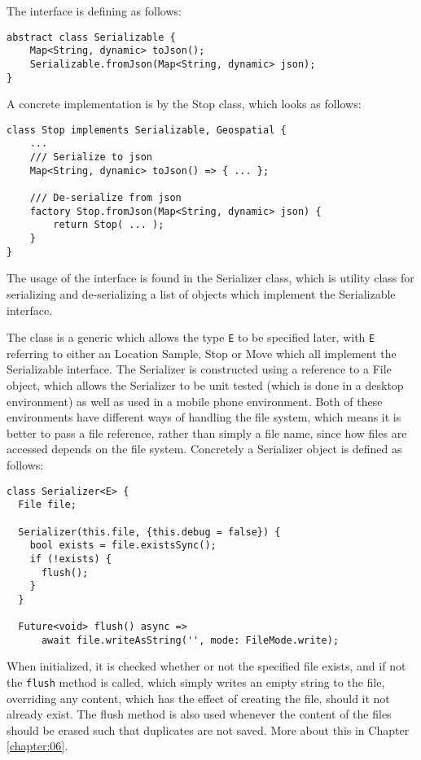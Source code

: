The interface is defining as follows:
\begin{verbatim}
abstract class Serializable {
    Map<String, dynamic> toJson();
    Serializable.fromJson(Map<String, dynamic> json);
}
\end{verbatim}

A concrete implementation is by the Stop class, which looks as follows:

\begin{verbatim}
class Stop implements Serializable, Geospatial { 
    ...
    /// Serialize to json
    Map<String, dynamic> toJson() => { ... };

    /// De-serialize from json
    factory Stop.fromJson(Map<String, dynamic> json) {
        return Stop( ... );
    }
}
\end{verbatim}

The usage of the interface is found in the Serializer class, which is utility class for serializing and de-serializing a list of objects which implement the Serializable interface.

The class is a generic which allows the type \verb|E| to be specified later, with \verb|E| referring to either an Location Sample, Stop or Move which all implement the Serializable interface. The Serializer is constructed using a reference to a File object, which allows the Serializer to be unit tested (which is done in a desktop environment) as well as used in a mobile phone environment. Both of these environments have different ways of handling the file system, which means it is better to pass a file reference, rather than simply a file name, since how files are accessed depends on the file system. Concretely a Serializer object is defined as follows:
\begin{verbatim}
class Serializer<E> {
  File file;
  
  Serializer(this.file, {this.debug = false}) {
    bool exists = file.existsSync();
    if (!exists) {
      flush();
    }
  }
  
  Future<void> flush() async =>
      await file.writeAsString('', mode: FileMode.write);
\end{verbatim}

When initialized, it is checked whether or not the specified file exists, and if not the \verb|flush| method is called, which simply writes an empty string to the file, overriding any content, which has the effect of creating the file, should it not already exist. The flush method is also used whenever the content of the files should be erased such that duplicates are not saved. More about this in Chapter \ref{chapter:06}.

